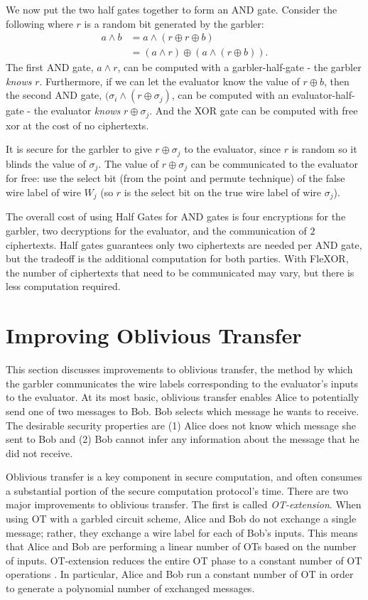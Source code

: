 We now put the two half gates together to form an AND gate. 
Consider the following where $r$ is a random bit generated by the garbler:
\begin{align}
    a \wedge b & = a \wedge (r \oplus r \oplus b) \\
               & = (a \wedge r) \oplus (a \wedge (r \oplus b)).
\end{align}
The first AND gate, $a \wedge r$, can be computed with a garbler-half-gate - the garbler \textit{knows} $r$. 
Furthermore, if we can let the evaluator know the value of $r \oplus b$, then the second AND gate, $(\sigma_i \wedge (r \oplus \sigma_j)$, can be computed with an evaluator-half-gate - the evaluator \textit{knows} $r \oplus \sigma_j$. 
And the XOR gate can be computed with free xor at the cost of no ciphertexts. 

It is secure for the garbler to give $r \oplus \sigma_j$ to the evaluator, since $r$ is random so it blinds the value of $\sigma_j$. 
The value of $r \oplus \sigma_j$ can be communicated to the evaluator for free: use the select bit (from the point and permute technique) of the false wire label of wire $W_j$ (so $r$ is the select bit on the true wire label of wire $\sigma_j$).

The overall cost of using Half Gates for AND gates is four encryptions for the garbler, two decryptions for the evaluator, and the communication of $2$ ciphertexts. 
Half gates guarantees only two ciphertexts are needed per AND gate, but the tradeoff is the additional computation for both parties.
With FleXOR, the number of ciphertexts that need to be communicated may vary, but there is less computation required.

\section{Improving Oblivious Transfer}
This section discusses improvements to oblivious transfer, the method by which the garbler communicates the wire labels corresponding to the evaluator's inputs to the evaluator.
At its most basic, oblivious transfer enables Alice to potentially send one of two messages to Bob.
Bob selects which message he wants to receive.
The desirable security properties are (1) Alice does not know which message she sent to Bob and (2) Bob cannot infer any information about the message that he did not receive.

Oblivious transfer is a key component in secure computation, and often consumes a substantial portion of the secure computation protocol's time.
There are two major improvements to oblivious transfer.
The first is called \textit{OT-extension}.
When using OT with a garbled circuit scheme, Alice and Bob do not exchange a single message; rather, they exchange a wire label for each of Bob's inputs.
This means that Alice and Bob are performing a linear number of OTs based on the number of inputs.
OT-extension reduces the entire OT phase to a constant number of OT operations \cite{otextension}.
In particular, Alice and Bob run a constant number of OT in order to generate a polynomial number of exchanged messages.

